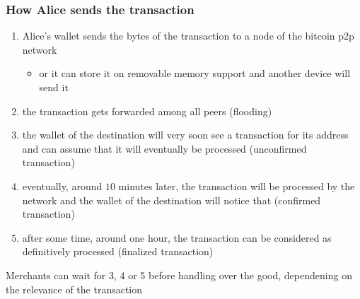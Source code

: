 \documentclass[11pt]{beamer}  %
\begin{document}
\begin{frame}\frametitle{How Alice sends the transaction}

  \begin{enumerate}
  \item Alice's wallet sends the bytes of the transaction to a node of the
    bitcoin p2p network
    \begin{itemize}
    \item or it can store it on removable memory support and another device
      will send it
    \end{itemize}
  \item the transaction gets forwarded among all peers (flooding)
  \item the wallet of the destination will very soon see a transaction
    for its address and can assume that it will eventually be processed
    (\alert{unconfirmed transaction})
  \item eventually, around $10$ minutes later,
    the transaction will be processed by the network and
    the wallet of the destination will notice that (\alert{confirmed transaction})
  \item after some time, around one hour, the transaction can be considered
    as definitively processed (\alert{finalized transaction})
  \end{enumerate}

  Merchants can wait for 3, 4 or 5 before handling over the good,
  dependening on the relevance of the transaction

\end{frame}
\end{document}
